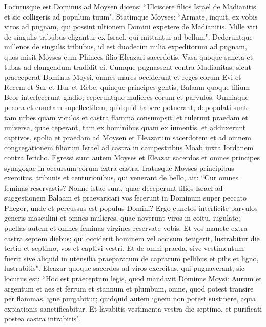 \begin{biblechapter}  
\verse Locutusque est Dominus ad Moysen dicens: 
\verse “Ulciscere filios Israel de Madianitis et sic colligeris ad populum tuum". 
\verse Statimque Moyses: “Armate, inquit, ex vobis viros ad pugnam, qui possint ultionem Domini expetere de Madianitis. 
\verse Mille viri de singulis tribubus eligantur ex Israel, qui mittantur ad bellum". 
\verse Dederuntque millenos de singulis tribubus, id est duodecim milia expeditorum ad pugnam, 
\verse quos misit Moyses cum Phinees filio Eleazari sacerdotis. Vasa quoque sancta et tubas ad clangendum tradidit ei. 
\verse Cumque pugnassent contra Madianitas, sicut praeceperat Dominus Moysi, omnes mares occiderunt 
\verse et reges eorum Evi et Recem et Sur et Hur et Rebe, quinque principes gentis, Balaam quoque filium Beor interfecerunt gladio; 
\verse ceperuntque mulieres eorum et parvulos. Omniaque pecora et cunctam supellectilem, quidquid habere potuerant, depopulati sunt: 
\verse tam urbes quam viculos et castra flamma consumpsit; 
\verse et tulerunt praedam et universa, quae ceperant, tam ex hominibus quam ex iumentis, 
\verse et adduxerunt captivos, spolia et praedam ad Moysen et Eleazarum sacerdotem et ad omnem congregationem filiorum Israel ad castra in campestribus Moab iuxta Iordanem contra Iericho. 
\verse Egressi sunt autem Moyses et Eleazar sacerdos et omnes principes synagogae in occursum eorum extra castra. 
\verse Iratusque Moyses principibus exercitus, tribunis et centurionibus, qui venerant de bello, 
\verse ait: “Cur omnes feminas reservastis? 
\verse Nonne istae sunt, quae deceperunt filios Israel ad suggestionem Balaam et praevaricari vos fecerunt in Dominum super peccato Phegor, unde et percussus est populus Domini? 
\verse Ergo cunctos interficite parvulos generis masculini et omnes mulieres, quae noverunt viros in coitu, iugulate; 
\verse puellas autem et omnes feminas virgines reservate vobis. 
\verse Et vos manete extra castra septem diebus; qui occiderit hominem vel occisum tetigerit, lustrabitur die tertio et septimo, vos et captivi vestri. 
\verse Et de omni praeda, sive vestimentum fuerit sive aliquid in utensilia praeparatum de caprarum pellibus et pilis et ligno, lustrabitis". 
\verse Eleazar quoque sacerdos ad viros exercitus, qui pugnaverant, sic locutus est: “Hoc est praeceptum legis, quod mandavit Dominus Moysi: 
\verse Aurum et argentum et aes et ferrum et stannum et plumbum, 
\verse omne, quod potest transire per flammas, igne purgabitur; quidquid autem ignem non potest sustinere, aqua expiationis sanctificabitur. 
\verse Et lavabitis vestimenta vestra die septimo, et purificati postea castra intrabitis". 

\end{biblechapter}
